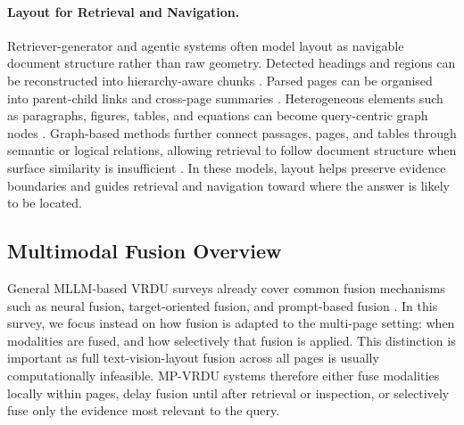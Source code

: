 \documentclass[11pt]{article}
\begin{document}
\paragraph{Layout for Retrieval and Navigation.}
Retriever-generator and agentic systems often model layout as navigable document structure rather than raw geometry. Detected headings and regions can be reconstructed into hierarchy-aware chunks \cite{shin2025multidocfusion}. Parsed pages can be organised into parent-child links and cross-page summaries \cite{gong2025mhier}. Heterogeneous elements such as paragraphs, figures, tables, and equations can become query-centric graph nodes \cite{zhang2026mldocrag}. Graph-based methods further connect passages, pages, and tables through semantic or logical relations, allowing retrieval to follow document structure when surface similarity is insufficient \cite{wang2024knowledge, wu2025molorag}. In these models, layout helps preserve evidence boundaries and guides retrieval and navigation toward where the answer is likely to be located.

\subsection{Multimodal Fusion Overview}
General MLLM-based VRDU surveys already cover common fusion mechanisms such as neural fusion, target-oriented fusion, and prompt-based fusion \cite{ding2025survey}. In this survey, we focus instead on how fusion is adapted to the multi-page setting: when modalities are fused, and how selectively that fusion is applied. This distinction is important as full text-vision-layout fusion across all pages is usually computationally infeasible. MP-VRDU systems therefore either fuse modalities locally within pages, delay fusion until after retrieval or inspection, or selectively fuse only the evidence most relevant to the query.

\end{document}

